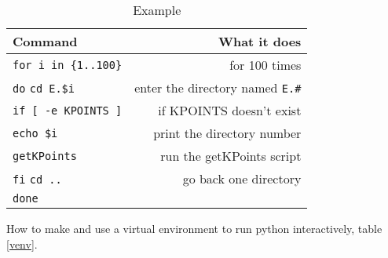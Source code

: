 \documentclass{article}
\begin{document}
\begin{table}
        \begin{center}
                \caption{Example}
                \label{loopexample}
                \begin{tabular}{l|r}
                  \textbf{Command} & \textbf{What it does}\\
                  \hline
                  \verb|for i in {1..100}| & for 100 times \\
                  \verb|do|
                  \verb|cd E.$i| & enter the directory named
                                   \verb|E.#|\\
                  \verb|if [ -e KPOINTS ]| & if KPOINTS doesn't exist
                  \\
                  \verb|echo $i| & print the directory number \\
                  \verb|getKPoints| & run the getKPoints script \\
                  \verb|fi|
                  \verb|cd ..| & go back one directory \\
                  \verb|done|
                 \end{tabular}
        \end{center}
\end{table}



How to make and use a virtual environment to run python interactively, table \ref{venv}.
\end{document}
